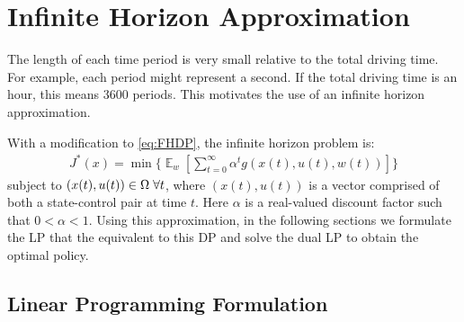 \documentclass[conference]{IEEEtran}
\DeclareMathOperator{\E}{\mathbb{E}}
\begin{document}


\section{Infinite Horizon Approximation}
The length of each time period is very small relative to the total driving time. For example, each period might represent a second. If the total driving time is an hour, this means 3600 periods. This motivates the use of an infinite horizon approximation.


With a modification to \eqref{eq:FHDP}, the infinite horizon problem is:
\begin{multline} \label{eq:DP}
J^{*}(x)= \min\Biggl\{\mathop{\E}_{w}\left[\sum_{t=0}^{\infty}\alpha^{t}g(x(t),u(t),w(t))\right]\Biggr\}
\end{multline} subject to $(x(t),u(t))\in\Omega \hspace{0.1cm}\forall t$, where $(x(t),u(t))$ is a vector comprised of both a state-control pair at time $t$. Here $\alpha$ is a real-valued discount factor such that $0<\alpha<1$. Using this approximation, in the following sections we formulate the LP that the equivalent to this DP and solve the dual LP to obtain the optimal policy.


\subsection{Linear Programming Formulation}
\end{document}
